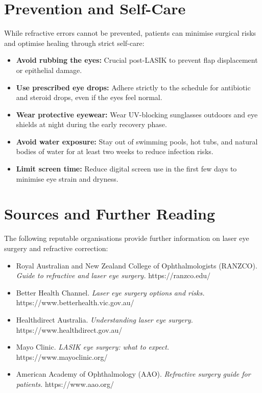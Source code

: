 \section*{Prevention and Self-Care}
While refractive errors cannot be prevented, patients can minimise surgical risks and optimise healing through strict self-care:
\begin{itemize}
    \item \textbf{Avoid rubbing the eyes:} Crucial post-LASIK to prevent flap displacement or epithelial damage.
    \item \textbf{Use prescribed eye drops:} Adhere strictly to the schedule for antibiotic and steroid drops, even if the eyes feel normal.
    \item \textbf{Wear protective eyewear:} Wear UV-blocking sunglasses outdoors and eye shields at night during the early recovery phase.
    \item \textbf{Avoid water exposure:} Stay out of swimming pools, hot tubs, and natural bodies of water for at least two weeks to reduce infection risks.
    \item \textbf{Limit screen time:} Reduce digital screen use in the first few days to minimise eye strain and dryness.
\end{itemize}

\section*{Sources and Further Reading}
The following reputable organisations provide further information on laser eye surgery and refractive correction:
\begin{itemize}
    \item Royal Australian and New Zealand College of Ophthalmologists (RANZCO). \textit{Guide to refractive and laser eye surgery.} https://ranzco.edu/
    \item Better Health Channel. \textit{Laser eye surgery options and risks.} https://www.betterhealth.vic.gov.au/
    \item Healthdirect Australia. \textit{Understanding laser eye surgery.} https://www.healthdirect.gov.au/
    \item Mayo Clinic. \textit{LASIK eye surgery: what to expect.} https://www.mayoclinic.org/
    \item American Academy of Ophthalmology (AAO). \textit{Refractive surgery guide for patients.} https://www.aao.org/
\end{itemize}
